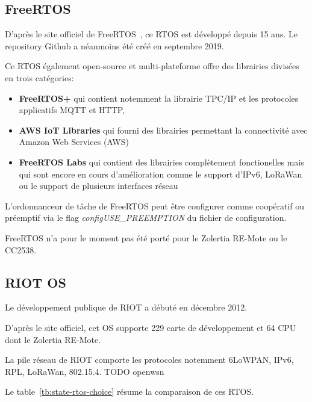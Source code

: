 \subsection*{FreeRTOS}
    D'après le site officiel de FreeRTOS~\cite{freertos}, ce RTOS est développé depuis 15 ans.
    Le repository Github a néanmoins été créé en septembre 2019.

    Ce RTOS également open-source et multi-plateforme offre des librairies divisées en trois catégories:
    \begin{itemize}

        \item \textbf{FreeRTOS+} qui contient notemment la librairie TPC/IP et les protocoles applicatifs MQTT et HTTP,
        \item \textbf{AWS IoT Libraries} qui fourni des librairies permettant la connectivité avec Amazon Web Services (AWS)
        \item \textbf{FreeRTOS Labs} qui contient des librairies complètement fonctionelles mais qui sont encore en cours d'amélioration comme le support d'IPv6, LoRaWan ou le support de plusieurs interfaces réseau
    \end{itemize}
    
    
    L'ordonnanceur de tâche de FreeRTOS peut être configurer comme coopératif ou préemptif via le flag \textit{configUSE\_PREEMPTION} du fichier de configuration.

    FreeRTOS n'a pour le moment pas été porté pour le Zolertia RE-Mote ou le CC2538.

\subsection*{RIOT OS}
    Le développement publique de RIOT a débuté en décembre 2012\footnotemark[1].
    
    D'après le site officiel, cet OS supporte 229 carte de développement et 64 CPU dont le Zolertia RE-Mote. 

    La pile réseau de RIOT comporte les protocoles notemment 6LoWPAN, IPv6, RPL, LoRaWan, 802.15.4.
    TODO openwsn


Le table~\ref{tb:state-rtos-choice} résume la comparaison de ces RTOS.

